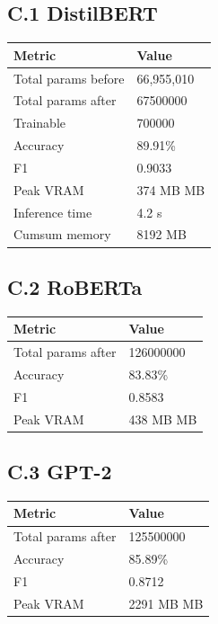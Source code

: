 \subsection{C.1 DistilBERT}

\begin{table}[H]
\centering
\small
\begin{tabular}{ll}
\toprule
\textbf{Metric} & \textbf{Value} \\
\midrule
Total params before & 66,955,010 \\
Total params after & 67500000 \\
Trainable & 700000 \\
Accuracy & 89.91\% \\
F1 & 0.9033 \\
Peak VRAM & 374 MB MB \\
Inference time & 4.2 s \\
Cumsum memory & 8192 MB \\
\bottomrule
\end{tabular}
\end{table}

\subsection{C.2 RoBERTa}

\begin{table}[H]
\centering
\small
\begin{tabular}{ll}
\toprule
\textbf{Metric} & \textbf{Value} \\
\midrule
Total params after & 126000000 \\
Accuracy & 83.83\% \\
F1 & 0.8583 \\
Peak VRAM & 438 MB MB \\
\bottomrule
\end{tabular}
\end{table}

\subsection{C.3 GPT-2}

\begin{table}[H]
\centering
\small
\begin{tabular}{ll}
\toprule
\textbf{Metric} & \textbf{Value} \\
\midrule
Total params after & 125500000 \\
Accuracy & 85.89\% \\
F1 & 0.8712 \\
Peak VRAM & 2291 MB MB \\
\bottomrule
\end{tabular}
\end{table}

